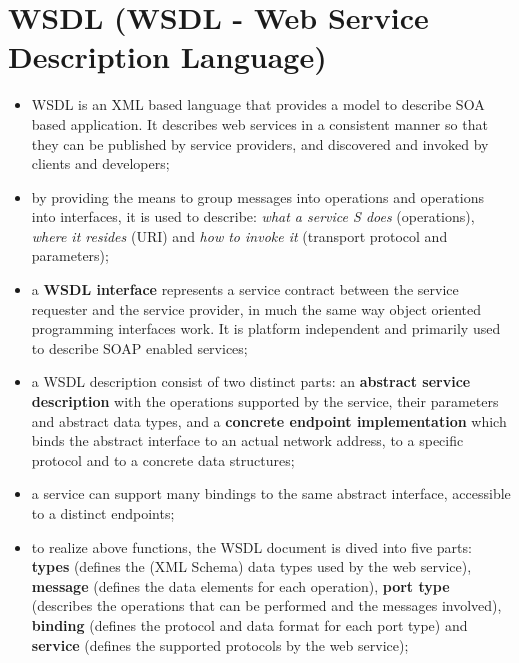 \documentclass[oneside]{article}
\begin{document}
\section{WSDL (WSDL - Web Service Description Language)}
\begin{itemize}
    \item WSDL is an XML based language that provides a model to describe SOA based application. It describes web services in a consistent manner so that they can be published by service providers, and discovered and invoked by clients and developers;
    
    \item by providing the means to group messages into operations and operations into interfaces, it is used to describe: \textit{what a service S does} (operations), \textit{where it resides} (URI) and \textit{how to invoke it} (transport protocol and parameters);

    \item a \textbf{WSDL interface} represents a service contract between the service requester and the service provider, in much the same way object oriented programming interfaces work. It is platform independent and primarily used to describe SOAP enabled services;
    
    \item a WSDL description consist of two distinct parts: an \textbf{abstract service description} with the operations supported by the service, their parameters and abstract data types, and a \textbf{concrete endpoint implementation} which binds the abstract interface to an actual network address, to a specific protocol and to a concrete data structures;
    
    \item a service can support many bindings to the same abstract interface, accessible to a distinct endpoints;
    
    \item to realize above functions, the WSDL document is dived into five parts: \textbf{types} (defines the (XML Schema) data types used by the web service), \textbf{message} (defines the data elements for each operation), \textbf{port type} (describes the operations that can be performed and the messages involved), \textbf{binding} (defines the protocol and data format for each port type) and \textbf{service} (defines the supported protocols by the web service);
\end{itemize}
\end{document}
